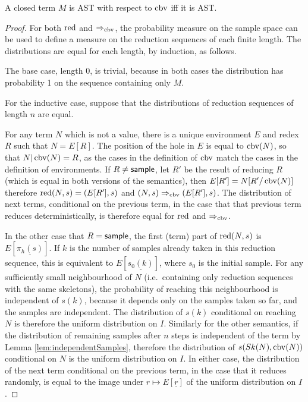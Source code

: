 \begin{theorem} \label{thm:AstEquivalence}
A closed term $M$ is AST with respect to $\operatorname{cbv}$ iff it is AST.
\end{theorem}
\begin{proof}

For both $\operatorname{red}$ and $\Rightarrow_{\operatorname{cbv}}$, the probability measure on the sample space can be used to define a measure on the reduction sequences of each finite length. The distributions are equal for each length, by induction, as follows.

The base case, length 0, is trivial, because in both cases the distribution has probability 1 on the sequence containing only $M$.

For the inductive case, suppose that the distributions of reduction sequences of length $n$ are equal. 

For any term $N$ which is not a value, there is a unique environment $E$ and redex $R$ such that $N = E[R]$. The position of the hole in $E$ is equal to $\operatorname{cbv}(N)$, so that $N|\operatorname{cbv}(N) = R$, as the cases in the definition of $\operatorname{cbv}$ match the cases in the definition of environments. If $R \neq \mathsf{sample}$, let $R'$ be the result of reducing $R$ (which is equal in both versions of the semantics), then $E[R'] = N[R' / \operatorname{cbv}(N)]$ therefore $\operatorname{red}(N,s) = (E[R'],s)$ and $(N,s) \Rightarrow_{\operatorname{cbv}} (E[R'],s)$. The distribution of next terms, conditional on the previous term, in the case that that previous term reduces deterministically, is therefore equal for $\operatorname{red}$ and $\Rightarrow_{\operatorname{cbv}}$.

In the other case that $R = \mathsf{sample}$, the first (term) part of $\operatorname{red}(N,s)$ is $E[\underline{\pi_h(s)}]$. If $k$ is the number of samples already taken in this reduction sequence, this is equivalent to $E[\underline{s_0(k)}]$, where $s_0$ is the initial sample. For any sufficiently small neighbourhood of $N$ (i.e.~containing only reduction sequences with the same skeletons), the probability of reaching this neighbourhood is independent of $s(k)$, because it depends only on the samples taken so far, and the samples are independent. The distribution of $s(k)$ conditional on reaching $N$ is therefore the uniform distribution on $I$. Similarly for the other semantics, if the distribution of remaining samples after $n$ steps is independent of the term by Lemma \ref{lem:independentSamples}, therefore the distribution of $s(Sk(N),\operatorname{cbv}(N))$ conditional on $N$ is the uniform distribution on $I$. In either case, the distribution of the next term conditional on the previous term, in the case that it reduces randomly, is equal to the image under $r \mapsto E[\underline r]$ of the uniform distribution on $I$.


\end{proof}
